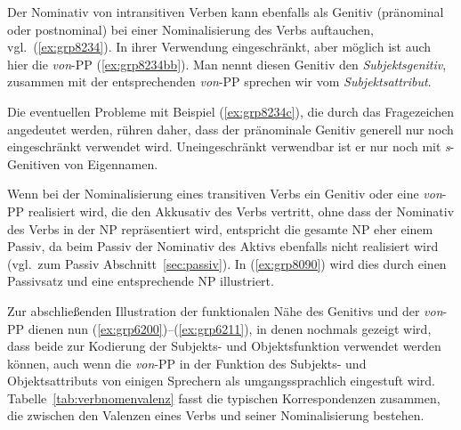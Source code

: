 Der Nominativ von intransitiven Verben kann ebenfalls als Genitiv (pränominal oder postnominal) bei einer Nominalisierung des Verbs auftauchen, vgl.\ (\ref{ex:grp8234}).
In ihrer Verwendung eingeschränkt, aber möglich ist auch hier die \textit{von}-PP (\ref{ex:grp8234bb}).
Man nennt diesen Genitiv den \textit{Subjektsgenitiv}, zusammen mit der entsprechenden \textit{von}-PP sprechen wir vom \textit{Subjektsattribut}.

\begin{exe}
  \ex\label{ex:grp8234}
  \begin{xlist}
  \end{xlist}
\end{exe}

Die eventuellen Probleme mit Beispiel (\ref{ex:grp8234c}), die durch das Fragezeichen angedeutet werden, rühren daher, dass der pränominale Genitiv generell nur noch eingeschränkt verwendet wird.
Uneingeschränkt verwendbar ist er nur noch mit \textit{s}-Genitiven von Eigennamen.

Wenn bei der Nominalisierung eines transitiven Verbs ein Genitiv oder eine \textit{von}-PP realisiert wird, die den Akkusativ des Verbs vertritt, ohne dass der Nominativ des Verbs in der NP repräsentiert wird, entspricht die gesamte NP eher einem Passiv, da beim Passiv der Nominativ des Aktivs ebenfalls nicht realisiert wird (vgl.\ zum Passiv Abschnitt~\ref{sec:passiv}).
In (\ref{ex:grp8090}) wird dies durch einen Passivsatz und eine entsprechende NP illustriert.

\begin{exe}
  \ex\label{ex:grp8090}
  \begin{xlist}
  \end{xlist}
\end{exe}

Zur abschließenden Illustration der funktionalen Nähe des Genitivs und der \textit{von}-PP dienen nun (\ref{ex:grp6200})--(\ref{ex:grp6211}), in denen nochmals gezeigt wird, dass beide zur Kodierung der Subjekts- und Objektsfunktion verwendet werden können, auch wenn die \textit{von}-PP in der Funktion des Subjekts- und Objektsattributs von einigen Sprechern als umgangssprachlich eingestuft wird.
Tabelle~\ref{tab:verbnomenvalenz} fasst die typischen Korrespondenzen zusammen, die zwischen den Valenzen eines Verbs und seiner Nominalisierung bestehen.

